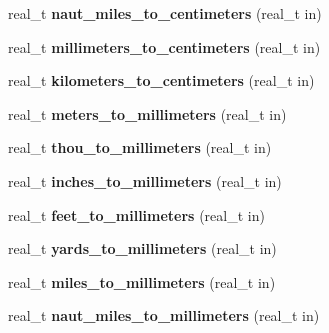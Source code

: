 \begin{DoxyCompactItemize}
\item 
\hypertarget{namespaceetk_af0ac70213f7e16be4819ab8c6295e04b}{real\-\_\-t {\bfseries naut\-\_\-miles\-\_\-to\-\_\-centimeters} (real\-\_\-t in)}\label{namespaceetk_af0ac70213f7e16be4819ab8c6295e04b}

\item 
\hypertarget{namespaceetk_a8cf1438652c4a9dbca79e2bf40dff00e}{real\-\_\-t {\bfseries millimeters\-\_\-to\-\_\-centimeters} (real\-\_\-t in)}\label{namespaceetk_a8cf1438652c4a9dbca79e2bf40dff00e}

\item 
\hypertarget{namespaceetk_a3da8d2ae55079130059b1c4fd0f8c0a1}{real\-\_\-t {\bfseries kilometers\-\_\-to\-\_\-centimeters} (real\-\_\-t in)}\label{namespaceetk_a3da8d2ae55079130059b1c4fd0f8c0a1}

\item 
\hypertarget{namespaceetk_a4ecf19af3872759551127e751caf7ec6}{real\-\_\-t {\bfseries meters\-\_\-to\-\_\-millimeters} (real\-\_\-t in)}\label{namespaceetk_a4ecf19af3872759551127e751caf7ec6}

\item 
\hypertarget{namespaceetk_ad199c17d083c48a7841ed3c4fd806b09}{real\-\_\-t {\bfseries thou\-\_\-to\-\_\-millimeters} (real\-\_\-t in)}\label{namespaceetk_ad199c17d083c48a7841ed3c4fd806b09}

\item 
\hypertarget{namespaceetk_a11eec8cfb4094d58e66afb29f55a2723}{real\-\_\-t {\bfseries inches\-\_\-to\-\_\-millimeters} (real\-\_\-t in)}\label{namespaceetk_a11eec8cfb4094d58e66afb29f55a2723}

\item 
\hypertarget{namespaceetk_a5411b5b381d919a267c2fc86b696c8e2}{real\-\_\-t {\bfseries feet\-\_\-to\-\_\-millimeters} (real\-\_\-t in)}\label{namespaceetk_a5411b5b381d919a267c2fc86b696c8e2}

\item 
\hypertarget{namespaceetk_a386b1274305cafabc3be380351846d5c}{real\-\_\-t {\bfseries yards\-\_\-to\-\_\-millimeters} (real\-\_\-t in)}\label{namespaceetk_a386b1274305cafabc3be380351846d5c}

\item 
\hypertarget{namespaceetk_acc02179570c39e1451856609021cf4e3}{real\-\_\-t {\bfseries miles\-\_\-to\-\_\-millimeters} (real\-\_\-t in)}\label{namespaceetk_acc02179570c39e1451856609021cf4e3}

\item 
\hypertarget{namespaceetk_a8dea2fb3ef1398818b82b1d732c4fdcd}{real\-\_\-t {\bfseries naut\-\_\-miles\-\_\-to\-\_\-millimeters} (real\-\_\-t in)}\label{namespaceetk_a8dea2fb3ef1398818b82b1d732c4fdcd}


\end{DoxyCompactItemize}
